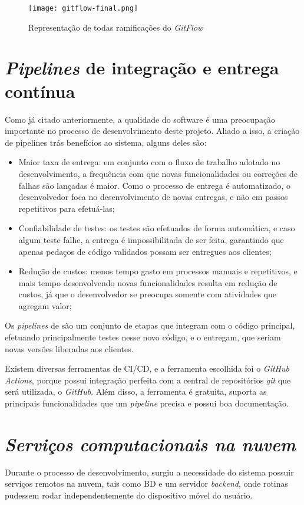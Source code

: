 \begin{figure}[!htb]
    \centering
    \texttt{[image: gitflow-final.png]}
    \caption{Representação de todas ramificações do \textit{GitFlow}}
    \label{fig:gitflow4}
\end{figure}


\section{\textit{Pipelines} de integração e entrega contínua}\label{sec:pipelines}
Como já citado anteriormente, a qualidade do software é uma preocupação importante no processo de desenvolvimento deste projeto. Aliado a isso, a criação de pipelines trás benefícios ao sistema, alguns deles são:
\begin{itemize}
    \item Maior taxa de entrega: em conjunto com o fluxo de trabalho adotado no desenvolvimento, a frequência com que novas funcionalidades ou correções de falhas são lançadas é maior. Como o processo de entrega é automatizado, o desenvolvedor foca no desenvolvimento de novas entregas, e não em passos repetitivos para efetuá-las;
    \item Confiabilidade de testes: os testes são efetuados de forma automática, e caso algum teste falhe, a entrega é impossibilitada de ser feita, garantindo que apenas pedaços de código validados possam ser entregues aos clientes;
    \item Redução de custos: menos tempo gasto em processos manuais e repetitivos, e mais tempo desenvolvendo novas funcionalidades resulta em redução de custos, já que o desenvolvedor se preocupa somente com atividades que agregam valor;
\end{itemize}

Os \textit{pipelines} de  são um conjunto de etapas que integram com o código principal, efetuando principalmente testes nesse novo código, e o entregam, que seriam novas versões liberadas aos clientes.

Existem diversas ferramentas de CI/CD, e a ferramenta escolhida foi o \textit{GitHub Actions}, porque possui integração perfeita com a central de repositórios \textit{git} que será utilizada, o \textit{GitHub}. Além disso, a ferramenta é gratuita, suporta as principais funcionalidades que um \textit{pipeline} precisa e possui boa documentação.

\section{\textit{Serviços computacionais na nuvem}}\label{sec:googlefirebase}
Durante o processo de desenvolvimento, surgiu a necessidade do sistema possuir serviços remotos na nuvem, tais como BD e um servidor \textit{backend}, onde rotinas pudessem rodar independentemente do dispositivo móvel do usuário.

